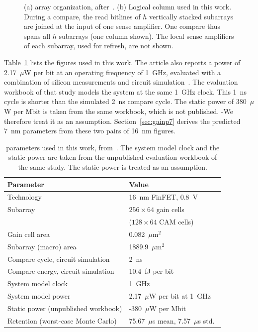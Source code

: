 \begin{figure}[t]
{}
\caption{(a) \gainp{} array organization, after~\cite{levi2026gainp}. (b) Logical column used in this work. During a compare, the read bitlines of $h$ vertically stacked subarrays are joined at the input of one sense amplifier. One compare thus spans all $h$ subarrays (one column shown). The local sense amplifiers of each subarray, used for refresh, are not shown.}
\label{fig:arch}
\end{figure}

Table~\ref{tab:gainp} lists the \gainp{} figures used in this work.
The article also reports a power of 2.17~$\mu$W per bit at an operating frequency of 1~GHz, evaluated with a combination of silicon measurements and circuit simulation~\cite{levi2026gainp}.
The evaluation workbook of that study models the system at the same 1~GHz clock. This 1~ns cycle is shorter than the simulated 2~ns compare cycle.
The static power of 380~$\mu$W per Mbit is taken from the same workbook, which is not published. \hyp{We therefore treat it as an assumption.}
Section~\ref{sec:gainp7} derives the predicted 7~nm parameters from these two pairs of 16~nm figures.

\begin{table}[!htbp]
\small
\centering
\caption{\gainp{} parameters used in this work, from~\cite{levi2026gainp}. The system model clock and the static power are taken from the unpublished evaluation workbook of the same study. The static power is treated as an assumption.}
\label{tab:gainp}
\begin{tabular}{ll}
\toprule
Parameter & Value \\
\midrule
Technology & 16~nm FinFET, 0.8~V \\
Subarray & $256\times64$ gain cells \\
 & ($128\times64$ CAM cells) \\
Gain cell area & 0.082~$\mu$m$^2$ \\
Subarray (macro) area & 1889.9~$\mu$m$^2$ \\
Compare cycle, circuit simulation & 2~ns \\
Compare energy, circuit simulation & 10.4~fJ per bit \\
System model clock & 1~GHz \\
System model power & 2.17~$\mu$W per bit at 1~GHz \\
Static power (unpublished workbook) & \hyp{380~$\mu$W per Mbit} \\
Retention (worst-case Monte Carlo) & 75.67~$\mu$s mean, 7.57~$\mu$s std.\ \\
\bottomrule
\end{tabular}
\end{table}
